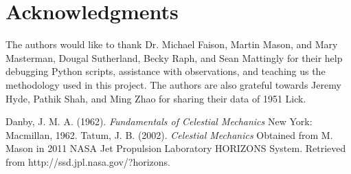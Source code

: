 \documentclass[12pt,journal,compsoc]{IEEEtran}
\begin{document}
\section*{Acknowledgments}

The authors would like to thank Dr. Michael Faison, Martin Mason, and Mary Masterman, 
Dougal Sutherland, Becky Raph, and Sean Mattingly for their help debugging Python scripts, assistance with observations, and teaching us the methodology used in this project.
The authors are also grateful towards Jeremy Hyde, Pathik Shah, and Ming Zhao for sharing their
data of 1951 Lick.


\begin{thebibliography}{1}
Danby, J. M. A. (1962). \emph{Fundamentals of Celestial Mechanics} New York: Macmillan, 1962. 
Tatum, J. B. (2002). \emph{Celestial Mechanics} Obtained from M. Mason in 2011
{}
NASA Jet Propulsion Laboratory HORIZONS System. Retrieved from http://ssd.jpl.nasa.gov/?horizons.
\end{thebibliography}
\end{document}
